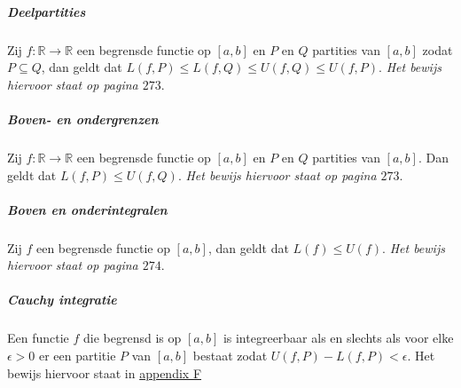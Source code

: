 \subparagraph{Deelpartities} Zij $f:\mathbb{R}\to\mathbb{R}$ een begrensde functie op $[a,b]$ en $P$ en $Q$ partities van $[a,b]$ zodat $P\subseteq Q$, dan geldt dat $L(f,P)\leq L(f,Q)\leq U(f,Q)\leq U(f,P)$. \textit{Het bewijs hiervoor staat op pagina $273$}.

\subparagraph{Boven- en ondergrenzen} Zij $f:\mathbb{R}\to\mathbb{R}$ een begrensde functie op $[a,b]$ en $P$ en $Q$ partities van $[a,b]$. Dan geldt dat $L(f,P)\leq U(f,Q)$. \textit{Het bewijs hiervoor staat op pagina $273$}.

\subparagraph{Boven en onderintegralen} Zij $f$ een begrensde functie op $[a,b]$, dan geldt dat $L(f)\leq U(f)$. \textit{Het bewijs hiervoor staat op pagina $274$}.

\subparagraph{Cauchy integratie} Een functie $f$ die begrensd is op $[a,b]$ is integreerbaar als en slechts als voor elke $\epsilon>0$ er een partitie $P$ van $[a,b]$ bestaat zodat $U(f,P)-L(f,P)<\epsilon$. Het bewijs hiervoor staat in \hyperref[sec:AF]{appendix F}
